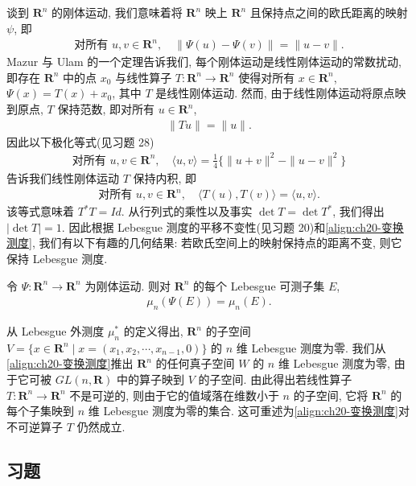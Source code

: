 \documentclass[../../main.tex]{subfiles}
\begin{document}
谈到 $\mathbf{R}^{n}$ 的刚体运动, 我们意味着将 $\mathbf{R}^{n}$ 映上 $\mathbf{R}^{n}$ 且保持点之间的欧氏距离的映射 $\psi$, 即
\begin{align*}
\text{对所有 }u,v\in\mathbf{R}^{n},\quad\|\Psi(u)-\Psi(v)\|=\|u-v\|.
\end{align*}
Mazur 与 Ulam 的一个定理告诉我们, 每个刚体运动是线性刚体运动的常数扰动, 即存在 $\mathbf{R}^{n}$ 中的点 $x_{0}$ 与线性算子 $T:\mathbf{R}^{n}\to\mathbf{R}^{n}$ 使得对所有 $x\in\mathbf{R}^{n}$, $\Psi(x)=T(x)+x_{0}$, 其中 $T$ 是线性刚体运动. 然而, 由于线性刚体运动将原点映到原点, $T$ 保持范数, 即对所有 $u\in\mathbf{R}^{n}$,
\begin{align*}
\|Tu\|=\|u\|.
\end{align*}
因此以下极化等式(见习题 28)
\begin{align}\label{align:ch20-极化等式}
\text{对所有 }u,v\in\mathbf{R}^{n},\quad\langle u,v\rangle=\frac{1}{4}\{\|u+v\|^{2}-\|u-v\|^{2}\}
\end{align}
告诉我们线性刚体运动 $T$ 保持内积, 即
\begin{align*}
\text{对所有 }u,v\in\mathbf{R}^{n},\quad\langle T(u),T(v)\rangle=\langle u,v\rangle.
\end{align*}
该等式意味着 $T^{*}T=Id$. 从行列式的乘性以及事实 $\det T=\det T^{*}$, 我们得出 $|\det T|=1$. 因此根据 Lebesgue 测度的平移不变性(见习题 20)和\eqref{align:ch20-变换测度}, 我们有以下有趣的几何结果: 若欧氏空间上的映射保持点的距离不变, 则它保持 Lebesgue 测度.

\begin{corollary}\label{corollary:ch20-刚体运动}
令 $\Psi:\mathbf{R}^{n}\to\mathbf{R}^{n}$ 为刚体运动. 则对 $\mathbf{R}^{n}$ 的每个 Lebesgue 可测子集 $E$,
\begin{align*}
\mu_{n}(\Psi(E))=\mu_{n}(E).
\end{align*}
\end{corollary}

从 Lebesgue 外测度 $\mu_{n}^{*}$ 的定义得出, $\mathbf{R}^{n}$ 的子空间 $V=\{x\in\mathbf{R}^{n}\mid x=(x_{1},x_{2},\cdots,x_{n-1},0)\}$ 的 $n$ 维 Lebesgue 测度为零. 我们从\eqref{align:ch20-变换测度}推出 $\mathbf{R}^{n}$ 的任何真子空间 $W$ 的 $n$ 维 Lebesgue 测度为零, 由于它可被 $GL(n,\mathbf{R})$ 中的算子映到 $V$ 的子空间. 由此得出若线性算子 $T:\mathbf{R}^{n}\to\mathbf{R}^{n}$ 不是可逆的, 则由于它的值域落在维数小于 $n$ 的子空间, 它将 $\mathbf{R}^{n}$ 的每个子集映到 $n$ 维 Lebesgue 测度为零的集合. 这可重述为\eqref{align:ch20-变换测度}对不可逆算子 $T$ 仍然成立.

\subsection*{习题}
\end{document}
